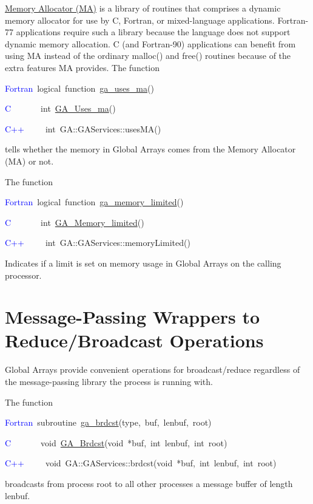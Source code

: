 \href{http://www.emsl.pnl.gov/docs/parsoft/ma/MAapi.html}{Memory Allocator (MA)}
is a library of routines that comprises a dynamic memory allocator
for use by C, Fortran, or mixed-language applications. Fortran- 77
applications require such a library because the language does not
support dynamic memory allocation. C (and Fortran-90) applications
can benefit from using MA instead of the ordinary malloc() and free()
routines because of the extra features MA provides. The function
\begin{lyxcode}
\textcolor{blue}{Fortran}~logical~function~\href{http://www.emsl.pnl.gov/docs/global/ga_ops.html\#ga_uses_ma}{ga\_{}uses\_{}ma}()~

\textcolor{blue}{C}~~~~~~~int~\href{http://www.emsl.pnl.gov/docs/global/c_nga_ops.html\#ga_uses_ma}{GA\_{}Uses\_{}ma}()~

\textcolor{blue}{C++}~~~~~int~GA::GAServices::usesMA()
\end{lyxcode}
tells whether the memory in Global Arrays comes from the Memory Allocator
(MA) or not.

The function
\begin{lyxcode}
\textcolor{blue}{Fortran}~logical~function~\href{http://www.emsl.pnl.gov/docs/global/ga_ops.html\#ga_memory_limited}{ga\_{}memory\_{}limited}()~

\textcolor{blue}{C}~~~~~~~int~\href{http://www.emsl.pnl.gov/docs/global/c_nga_ops.html\#ga_memory_limited}{GA\_{}Memory\_{}limited}()~

\textcolor{blue}{C++}~~~~~int~GA::GAServices::memoryLimited()
\end{lyxcode}
Indicates if a limit is set on memory usage in Global Arrays on the
calling processor. 


\section{Message-Passing Wrappers to Reduce/Broadcast Operations }

Global Arrays provide convenient operations for broadcast/reduce regardless
of the message-passing library the process is running with.

The function
\begin{lyxcode}
\textcolor{blue}{Fortran}~subroutine~\href{http://www.emsl.pnl.gov/docs/global/ga_ops.html\#ga_brdcst}{ga\_{}brdcst}(type,~buf,~lenbuf,~root)~

\textcolor{blue}{C}~~~~~~~void~\href{http://www.emsl.pnl.gov/docs/global/c_nga_ops.html\#ga_brdcst}{GA\_{}Brdcst}(void~{*}buf,~int~lenbuf,~int~root)~

\textcolor{blue}{C++}~~~~~void~GA::GAServices::brdcst(void~{*}buf,~int~lenbuf,~int~root)
\end{lyxcode}
broadcasts from process root to all other processes a message buffer
of length lenbuf.

